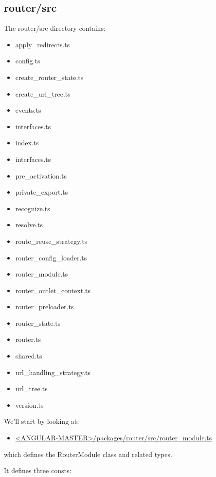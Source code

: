 \subsection{router/src}

The router/src directory contains:

\begin{itemize}
  \item apply\_redirects.ts
  \item config.ts
  \item create\_router\_state.ts
  \item create\_url\_tree.ts
  \item events.ts
  \item interfaces.ts
  \item index.ts
  \item interfaces.ts
  \item pre\_activation.ts
  \item private\_export.ts
  \item recognize.ts
  \item resolve.ts
  \item route\_reuse\_strategy.ts
  \item router\_config\_loader.ts
  \item router\_module.ts
  \item router\_outlet\_context.ts
  \item router\_preloader.ts
  \item router\_state.ts
  \item router.ts
  \item shared.ts
  \item url\_handling\_strategy.ts
  \item url\_tree.ts
  \item version.ts
\end{itemize}

We’ll start by looking at:

\begin{itemize}
  \item \href{https://github.com/angular/angular/blob/master/packages/router/src/router_module.ts}
        {<ANGULAR-MASTER>/packages/router/src/router\_module.ts}
\end{itemize}

which defines the RouterModule class and related types.

It defines three consts:



